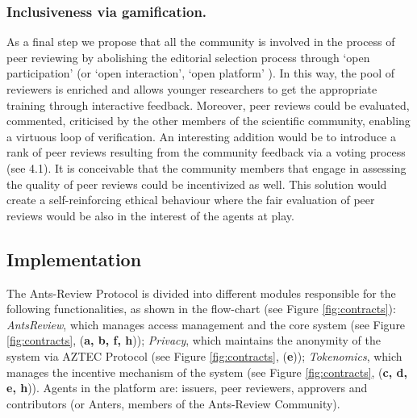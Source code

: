 \documentclass[runningheads]{llncs}
\begin{document}
\subsubsection{Inclusiveness via gamification.} As a final step we propose that all the community is involved in the process of peer reviewing by abolishing the editorial selection process through `open participation' (or `open interaction', `open platform' \cite{OPR-Ross-Hellauer,RossHellauer-OPR}). In this way, the pool of reviewers is enriched and allows younger researchers to get the appropriate training through interactive feedback. Moreover, peer reviews could be evaluated, commented, criticised by the other members of the scientific community, enabling a virtuous loop of verification. An interesting addition would be to introduce a rank of peer reviews resulting from the community feedback via a voting process (see 4.1). It is conceivable that the community members that engage in assessing the quality of peer reviews could be incentivized as well. This solution would create a self-reinforcing ethical behaviour where the fair evaluation of peer reviews would be also in the interest of the agents at play.

\subsection{Implementation}
The Ants-Review Protocol is divided into different modules responsible for the following functionalities, as shown in the flow-chart (see Figure \ref{fig:contracts}):
\emph{AntsReview}, which manages access management and the core system (see Figure \ref{fig:contracts}, (\textbf{a, b, f, h}));
\emph{Privacy}, which maintains the anonymity of the system via AZTEC Protocol (see Figure  \ref{fig:contracts}, (\textbf{e}));
\emph{Tokenomics}, which manages the incentive mechanism of the system (see Figure \ref{fig:contracts}, (\textbf{c, d, e, h})). \newline Agents in the platform are: issuers, peer reviewers, approvers and contributors (or Anters, members of the Ants-Review Community).
\end{document}

